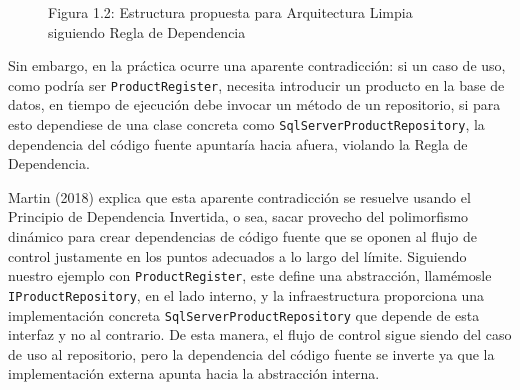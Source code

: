 \documentclass[12pt, a4paper]{article}
\begin{document}
        \begin{figure}[H]
            \centering
            \caption*{Figura 1.2: Estructura propuesta para Arquitectura Limpia siguiendo Regla de Dependencia}
            \label{fig:Figura1.2}
        \end{figure}

        Sin embargo, en la práctica ocurre una aparente contradicción: si un caso de uso, como podría ser \texttt{ProductRegister}, necesita introducir un producto en la base de datos, en tiempo de ejecución debe invocar un método de un repositorio, si para esto dependiese de una clase concreta como \texttt{SqlServerProductRepository}, la dependencia del código fuente apuntaría hacia afuera, violando la Regla de Dependencia.

        Martin (2018) explica que esta aparente contradicción se resuelve usando el Principio de Dependencia Invertida, o sea, sacar provecho del polimorfismo dinámico para crear dependencias de código fuente que se oponen al flujo de control justamente en los puntos adecuados a lo largo del límite. Siguiendo nuestro ejemplo con \texttt{ProductRegister}, este define una abstracción, llamémosle \texttt{IProductRepository}, en el lado interno, y la infraestructura proporciona una implementación concreta \texttt{SqlServerProductRepository} que depende de esta interfaz y no al contrario. De esta manera, el flujo de control sigue siendo del caso de uso al repositorio, pero la dependencia del código fuente se inverte ya que la implementación externa apunta hacia la abstracción interna.
\end{document}
